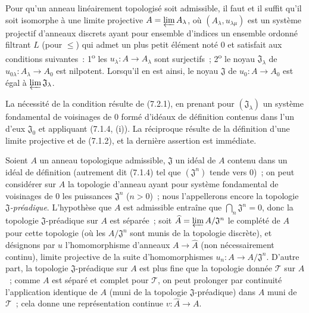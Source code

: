 \begin{lemma}[7.2.2]
\label{0.7.2.2-fr}
Pour qu'un anneau linéairement topologisé soit admissible, il faut et il suffit
qu'il soit isomorphe à une limite projective
$A=\varprojlim A_\lambda$, où $(A_\lambda,u_{\lambda\mu})$ est un système
projectif d'anneaux discrets ayant pour ensemble d'indices un ensemble ordonné
filtrant $L$ (pour $\leq$) qui admet un plus petit élément noté $0$ et satisfait
aux conditions suivantes~: 1\textsuperscript{o} les
$u_\lambda:A\to A_\lambda$ sont surjectifs~; 2\textsuperscript{o} le noyau
$\mathfrak J_\lambda$ de $u_{0\lambda}:A_\lambda\to A_0$ est nilpotent.
Lorsqu'il en est ainsi, le noyau $\mathfrak J$ de $u_0:A\to A_0$ est égal à
$\varprojlim\mathfrak J_\lambda$.
\end{lemma}

La nécessité de la condition résulte de (7.2.1), en prenant pour
$(\mathfrak J_\lambda)$ un système fondamental de voisinages de $0$ formé
d'idéaux de définition contenus dans l'un d'eux $\mathfrak J_0$ et appliquant
(7.1.4, (i)). La réciproque résulte de la définition d'une limite projective et
de (7.1.2), et la dernière assertion est immédiate.

\begin{env}[7.2.3]
\label{0.7.2.3-fr}
Soient $A$ un anneau topologique admissible, $\mathfrak J$ un idéal de $A$
contenu dans un idéal de définition (autrement dit (7.1.4) tel que
$(\mathfrak J^n)$ tende vers $0$)~; on peut considérer sur $A$ la topologie
d'anneau ayant pour système fondamental de voisinages de $0$ les puissances
$\mathfrak J^n$ ($n>0$)~; nous l'appellerons encore la topologie
\emph{$\mathfrak J$-préadique}. L'hypothèse que $A$ est admissible entraîne que
$\bigcap_n\mathfrak J^n=0$, donc la topologie $\mathfrak J$-préadique sur $A$
est séparée~; soit
$\widehat A=\varprojlim A/\mathfrak J^n$ le complété de $A$ pour cette topologie
(où les $A/\mathfrak J^n$ sont munis de la topologie discrète), et désignons
par $u$ l'homomorphisme d'anneaux $A\to\widehat A$ (non nécessairement
continu), limite projective de la suite d'homomorphismes
$u_n:A\to A/\mathfrak J^n$. D'autre part, la topologie $\mathfrak J$-préadique
sur $A$ est plus fine que la topologie donnée $\mathcal T$ sur $A$~; comme $A$
est séparé et complet pour $\mathcal T$, on peut prolonger par continuité
l'application identique de $A$ (muni de la topologie $\mathfrak J$-préadique)
dans $A$ muni de $\mathcal T$~; cela donne une représentation continue
$v:\widehat A\to A$.
\end{env}

